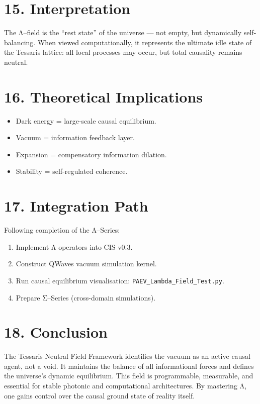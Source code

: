 \documentclass[11pt,a4paper]{article}
\begin{document}
\section{15. Interpretation}
The Λ–field is the “rest state” of the universe — not empty, but dynamically self-balancing.  
When viewed computationally, it represents the ultimate idle state of the Tessaris lattice: all local processes may occur, but total causality remains neutral.

\section{16. Theoretical Implications}
\begin{itemize}
\item Dark energy = large-scale causal equilibrium.  
\item Vacuum = information feedback layer.  
\item Expansion = compensatory information dilation.  
\item Stability = self-regulated coherence.  
\end{itemize}

\section{17. Integration Path}
Following completion of the Λ–Series:
\begin{enumerate}
\item Implement Λ operators into CIS v0.3.  
\item Construct QWaves vacuum simulation kernel.  
\item Run causal equilibrium visualisation: \texttt{PAEV\_Lambda\_Field\_Test.py}.  
\item Prepare Σ–Series (cross-domain simulations).  
\end{enumerate}

\section{18. Conclusion}
The Tessaris Neutral Field Framework identifies the vacuum as an active causal agent, not a void.  
It maintains the balance of all informational forces and defines the universe’s dynamic equilibrium.  
This field is programmable, measurable, and essential for stable photonic and computational architectures.  
By mastering Λ, one gains control over the causal ground state of reality itself.
\end{document}
